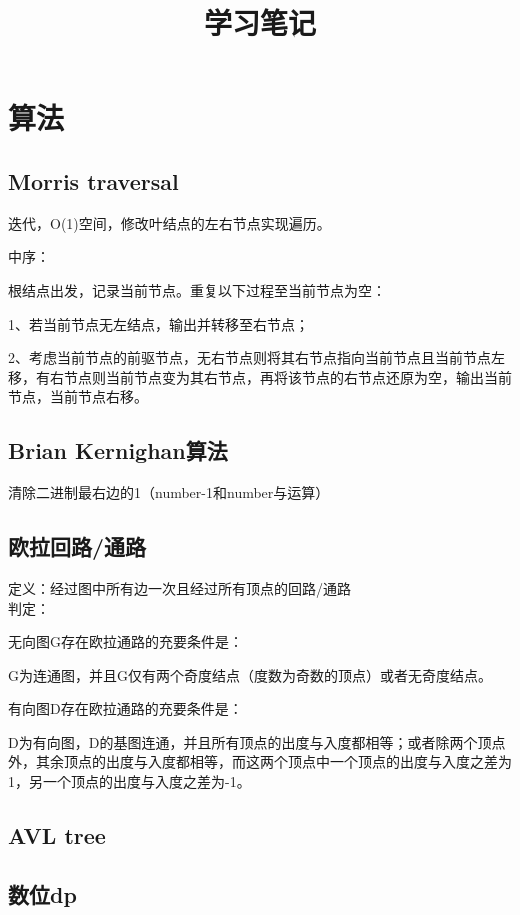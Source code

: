 \documentclass[cn,hazy,blue,screen,14pt]{note}
\title{学习笔记}
\author{}
\date{\zhtoday}
\begin{document}
\maketitle
\newpage
\tableofcontents
\newpage

\section{算法}
\subsection{Morris traversal}

迭代，O(1)空间，修改叶结点的左右节点实现遍历。

中序：

根结点出发，记录当前节点。重复以下过程至当前节点为空：

1、若当前节点无左结点，输出并转移至右节点；

2、考虑当前节点的前驱节点，无右节点则将其右节点指向当前节点且当前节点左移，有右节点则当前节点变为其右节点，再将该节点的右节点还原为空，输出当前节点，当前节点右移。

\subsection{Brian Kernighan算法}
清除二进制最右边的1（number-1和number与运算）

\subsection{欧拉回路/通路}
定义：经过图中所有边一次且经过所有顶点的回路/通路\\

判定：

无向图G存在欧拉通路的充要条件是：

G为连通图，并且G仅有两个奇度结点（度数为奇数的顶点）或者无奇度结点。

有向图D存在欧拉通路的充要条件是：

D为有向图，D的基图连通，并且所有顶点的出度与入度都相等；或者除两个顶点外，其余顶点的出度与入度都相等，而这两个顶点中一个顶点的出度与入度之差为1，另一个顶点的出度与入度之差为-1。

\subsection{AVL tree}
\subsection{数位dp}
\end{document}
